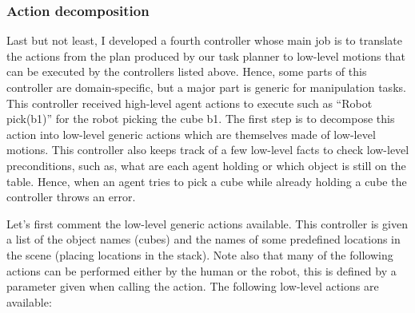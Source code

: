 \subsubsection{Action decomposition}

Last but not least, I developed a fourth controller whose main job is to translate the actions from the plan produced by our task planner to low-level motions that can be executed by the controllers listed above. Hence, some parts of this controller are domain-specific, but a major part is generic for manipulation tasks. This controller received high-level agent actions to execute such as ``Robot pick(b1)'' for the robot picking the cube b1. The first step is to decompose this action into low-level generic actions which are themselves made of low-level motions. This controller also keeps track of a few low-level facts to check low-level preconditions, such as, what are each agent holding or which object is still on the table. Hence, when an agent tries to pick a cube while already holding a cube the controller throws an error.

Let's first comment the low-level generic actions available. This controller is given a list of the object names (cubes) and the names of some predefined locations in the scene (placing locations in the stack). Note also that many of the following actions can be performed either by the human or the robot, this is defined by a parameter given when calling the action. The following low-level actions are available:

